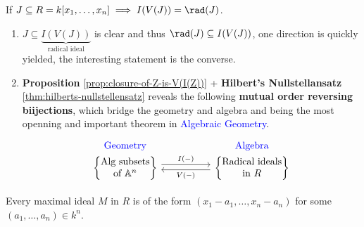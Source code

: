 \begin{theorem}
	\label{thm:hilberts-nullstellensatz}
	If \( J \subseteq R = k[x_1,\ldots, x_n] \implies I(V(J)) = \rad(J) \).
\end{theorem}

\begin{remark}
	\leavevmode
	\begin{enumerate}
		\item \( J \subseteq \underbrace{I(V(J))}_{\text{radical ideal}} \) is clear and thus
		      \( \rad(J) \subseteq I(V(J)) \), one direction is quickly yielded, the interesting statement
		      is the converse.
		\item \textbf{Proposition} \ref{prop:closure-of-Z-is-V(I(Z))} +
		      \textbf{Hilbert's Nullstellansatz} \ref{thm:hilberts-nullstellensatz} reveals the following \textbf{mutual order reversing
			      biijections}, which bridge the geometry and algebra and being the most openning and
		      important theorem in \textcolor{blue}{Algebraic Geometry}.
		      \[
			      \begin{tikzcd}[column sep=5em]
				      \begin{matrix}
					      \text{\textcolor{blue}{Geometry}} \\[1ex]
					      \left\{ \begin{matrix} \text{Alg subsets} \\ \text{of } \mathbb{A}^n \end{matrix} \right\}
				      \end{matrix}
				      \arrow[r, shift left=0.6ex, yshift=-1.7ex, "I(-)"] &
				      \begin{matrix}
					      \text{\textcolor{blue}{Algebra}} \\[1ex]
					      \left\{ \begin{matrix} \text{Radical ideals} \\ \text{in } R \end{matrix} \right\}
				      \end{matrix}
				      \arrow[l, shift left=0.6ex, yshift=-1.7ex, "V(-)"]
			      \end{tikzcd}
		      \]
	\end{enumerate}
\end{remark}

\begin{theorem}
	\label{thm:weak-nullstellensatz}
	Every maximal ideal \( M \) in \( R \) is of the form \( (x_1-a_1, \ldots, x_n -a_n) \) for some
	\( (a_1, \ldots, a_n) \in k^n \).
\end{theorem}

